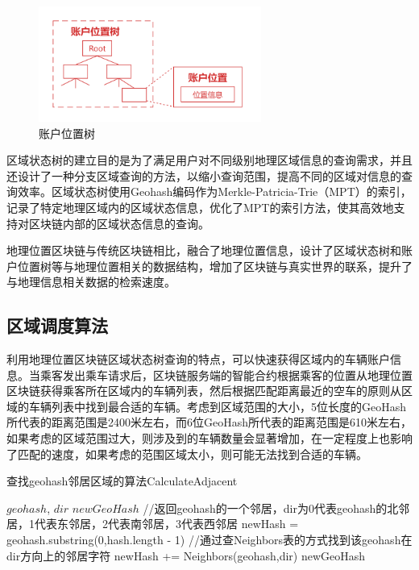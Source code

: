 \begin{figure}[h]
  \centering
  \includegraphics[width=0.65\textwidth]{figures/账户位置树}
  \caption{账户位置树}\label{fig:accountLocation}
\end{figure}

区域状态树的建立目的是为了满足用户对不同级别地理区域信息的查询需求，并且还设计了一种分支区域查询的方法，以缩小查询范围，提高不同的区域对信息的查询效率。区域状态树使用Geohash编码作为Merkle-Patricia-Trie（MPT）的索引，记录了特定地理区域内的区域状态信息，优化了MPT的索引方法，使其高效地支持对区块链内部的区域状态信息的查询。

地理位置区块链与传统区块链相比，融合了地理位置信息，设计了区域状态树和账户位置树等与地理位置相关的数据结构，增加了区块链与真实世界的联系，提升了与地理信息相关数据的检索速度。

\subsection{区域调度算法}

利用地理位置区块链区域状态树查询的特点，可以快速获得区域内的车辆账户信息。当乘客发出乘车请求后，区块链服务端的智能合约根据乘客的位置从地理位置区块链获得乘客所在区域内的车辆列表，然后根据匹配距离最近的空车的原则从区域的车辆列表中找到最合适的车辆。考虑到区域范围的大小，5位长度的GeoHash所代表的距离范围是2400米左右，而6位GeoHash所代表的距离范围是610米左右，如果考虑的区域范围过大，则涉及到的车辆数量会显著增加，在一定程度上也影响了匹配的速度，如果考虑的范围区域太小，则可能无法找到合适的车辆。

\begin{algorithm}[h]
  \caption{查找geohash邻居区域的算法CalculateAdjacent}
  \label{alg:findNeighbor}
  \begin{algorithmic}[1]
    \REQUIRE $geohash$, $dir$
    \ENSURE $newGeoHash$
    \STATE //返回geohash的一个邻居，dir为0代表geohash的北邻居，1代表东邻居，2代表南邻居，3代表西邻居
    \STATE newHash = geohash.substring(0,hash.length - 1)
    \STATE //通过查Neighbors表的方式找到该geohash在dir方向上的邻居字符
    \STATE newHash += Neighbors(geohash,dir)
    \RETURN newGeoHash
    \end{algorithmic}
\end{algorithm}

